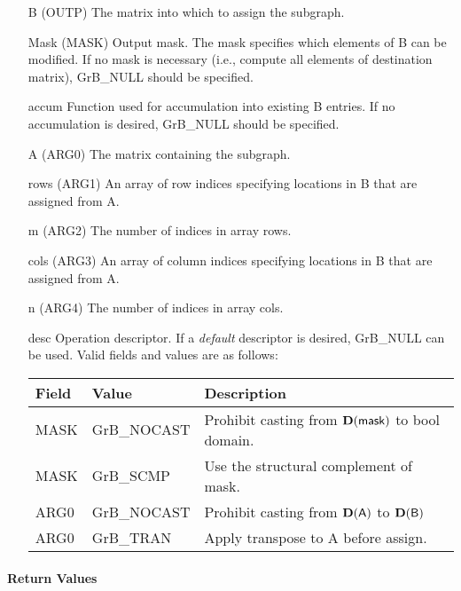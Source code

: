 \begin{itemize}[leftmargin=1.1in]
    \item[{\sf B}]   ({\sf OUTP}) The matrix into which to assign the subgraph.
    \item[{\sf Mask}] ({\sf MASK}) Output mask. The mask specifies which elements
    of {\sf B} can be modified. If no mask is necessary (i.e., compute all
    elements of destination matrix), {\sf GrB\_NULL} should be specified.
    \item[{\sf accum}] Function used for accumulation into existing {\sf B} entries.  If no accumulation
                        is desired, {\sf GrB\_NULL} should be specified.
    \item[{\sf A}]   ({\sf ARG0}) The matrix containing the subgraph.
    \item[{\sf rows}]     ({\sf ARG1}) An array of row indices specifying locations in {\sf B} that
                       are assigned from {\sf A}. 
    \item[{\sf m}]     ({\sf ARG2}) The number of indices in array {\sf rows}.
    \item[{\sf cols}]     ({\sf ARG3}) An array of column indices 
                       specifying locations in {\sf B} that are assigned from {\sf A}.
    \item[{\sf n}]	({\sf ARG4}) The number of indices in array {\sf cols}.
    \item[{\sf desc}]   Operation descriptor. If a
    \emph{default} descriptor is desired, {\sf GrB\_NULL} can be
    used. Valid fields and values are as follows: \\
    \begin{tabular}{lll}
    Field  & Value & Description \\
    \hline
    {\sf MASK} & {\sf GrB\_NOCAST} & Prohibit casting from $\bold{D}({\sf mask})$ to {\sf bool} domain. \\
    {\sf MASK} & {\sf GrB\_SCMP} & Use the structural complement of {\sf mask}. \\
    {\sf ARG0} & {\sf GrB\_NOCAST} & Prohibit casting from $\bold{D}({\sf A})$ to $\bold{D}({\sf B})$ \\
    {\sf ARG0} & {\sf GrB\_TRAN} & Apply transpose to {\sf A} before assign. \\
    \end{tabular}
\end{itemize}

\paragraph{Return Values}

